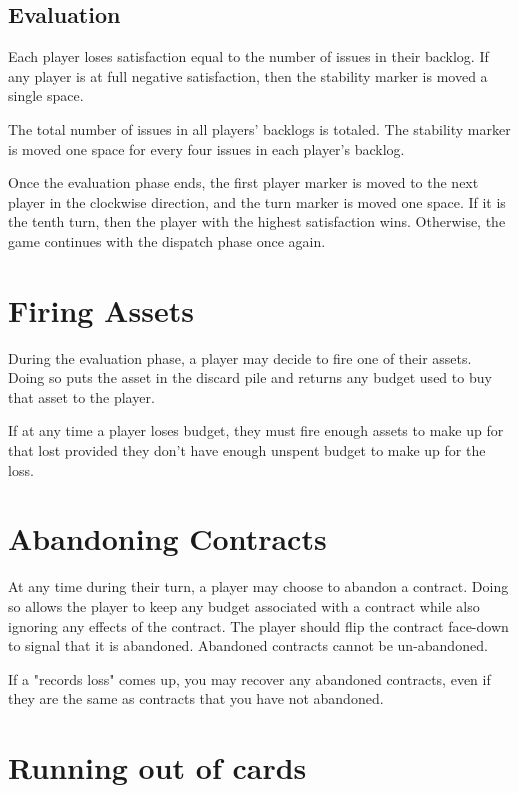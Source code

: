 \documentclass[twocolumn]{article}
\begin{document}
\pagebreak

\subsection*{Evaluation}

Each player loses satisfaction equal to the number of issues in their backlog. If any player is at full negative satisfaction, then the stability marker is moved a single space.

The total number of issues in all players' backlogs is totaled. The stability marker is moved one space for every four issues in each player's backlog.

Once the evaluation phase ends, the first player marker is moved to the next player in the clockwise direction, and the turn marker is moved one space. If it is the tenth turn, then the player with the highest satisfaction wins. Otherwise, the game continues with the dispatch phase once again.

\section*{Firing Assets}

During the evaluation phase, a player may decide to fire one of their assets. Doing so puts the asset in the discard pile and returns any budget used to buy that asset to the player.

If at any time a player loses budget, they must fire enough assets to make up for that lost provided they don't have enough unspent budget to make up for the loss.

\section*{Abandoning Contracts}

At any time during their turn, a player may choose to abandon a contract. Doing so allows the player to keep any budget associated with a contract while also ignoring any effects of the contract. The player should flip the contract face-down to signal that it is abandoned. Abandoned contracts cannot be un-abandoned.

If a "records loss" comes up, you may recover any abandoned contracts, even if they are the same as contracts that you have not abandoned.

\section*{Running out of cards}
\end{document}
